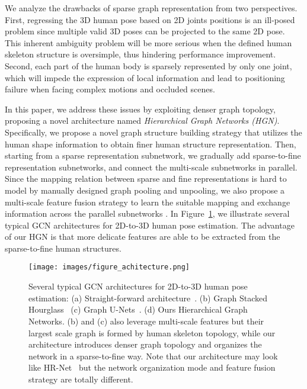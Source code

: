 \documentclass{bmvc2k}
\begin{document}
We analyze the drawbacks of sparse graph representation from two perspectives. First, regressing the 3D human pose based on 2D joints positions is an ill-posed problem since multiple valid 3D poses can be projected to the same 2D pose. This inherent ambiguity problem will be more serious when the defined human skeleton structure is oversimple, thus hindering performance improvement. Second, each part of the human body is sparsely represented by only one joint, which will impede the expression of local information and lead to positioning failure when facing complex motions and occluded scenes.  


In this paper, we address these issues by exploiting denser graph topology,
proposing a novel architecture named \textit{Hierarchical Graph Networks (HGN)}. Specifically, we propose a novel graph structure building strategy that utilizes the human shape information to obtain finer human structure representation. Then, starting from a sparse representation subnetwork, we gradually add sparse-to-fine representation subnetworks, and connect the multi-scale subnetworks in parallel. Since the 
mapping relation between sparse and fine representations is hard to model by manually designed  graph pooling and unpooling, 
we also propose a multi-scale feature fusion strategy to learn the suitable mapping and exchange information across the parallel subnetworks . In Figure~\ref{fig:various}, we illustrate several typical GCN architectures for 2D-to-3D human pose estimation. The advantage of our HGN is that more delicate features are able to be extracted from the sparse-to-fine human structures. 
\begin{figure}[!t]
\vspace{-3pt}
\renewcommand{\baselinestretch}{1.0}
\setlength{\abovecaptionskip}{-10pt}
\setlength{\belowcaptionskip}{-10pt}
\centering
\texttt{[image: images/figure\_achitecture.png]}
\caption{Several typical GCN architectures for 2D-to-3D human pose estimation: (a) Straight-forward architecture~\cite{zhao2019semantic}. (b) Graph Stacked Hourglass~\cite{2021Graph}  (c) Graph U-Nets~\cite{gao2019graph}. (d) Ours Hierarchical Graph Networks. (b) and (c) also leverage multi-scale features but their largest scale graph is formed by human skeleton topology, while our architecture introduces denser graph topology and organizes the network in a sparse-to-fine way. Note that our architecture may look like HR-Net~\cite{sun2019hr} but the network organization mode and feature fusion strategy are totally different.   } \label{fig:various}
\end{figure}
\end{document}
